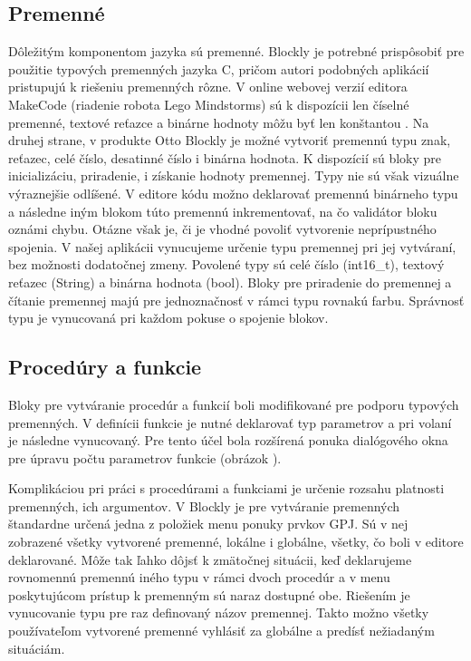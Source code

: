 \subsection{Premenné}
Dôležitým komponentom jazyka sú premenné. Blockly je potrebné prispôsobiť pre použitie typových premenných jazyka C, pričom autori podobných aplikácií pristupujú k riešeniu premenných rôzne. V online webovej verzií editora MakeCode (riadenie robota Lego Mindstorms) sú k dispozícii len číselné premenné, textové reťazce a binárne hodnoty môžu byť len konštantou \cite{makeCodeWebEditor}. Na druhej strane, v produkte Otto Blockly je možné vytvoriť premennú typu znak, reťazec, celé číslo, desatinné číslo i binárna hodnota. K dispozícií sú bloky pre inicializáciu, priradenie, i získanie hodnoty premennej. Typy nie sú však vizuálne výraznejšie odlíšené. V editore kódu možno deklarovať premennú binárneho typu a následne iným blokom túto premennú inkrementovať, na čo validátor bloku oznámi chybu. Otázne však je, či je vhodné povoliť vytvorenie neprípustného spojenia. V našej aplikácii vynucujeme určenie typu premennej pri jej vytváraní, bez možnosti dodatočnej zmeny. Povolené typy sú celé číslo (int16\_t), textový reťazec (String) a binárna hodnota (bool). Bloky pre priradenie do premennej a čítanie premennej majú pre jednoznačnosť v rámci typu rovnakú farbu. Správnosť typu je vynucovaná pri každom pokuse o spojenie blokov.

\subsection{Procedúry a funkcie}
Bloky pre vytváranie procedúr a funkcií boli modifikované pre podporu typových premenných. V definícii funkcie je nutné deklarovať typ parametrov a pri volaní je následne vynucovaný. Pre tento účel bola rozšírená ponuka dialógového okna pre úpravu počtu parametrov funkcie (obrázok \label{obr:pocedure-definition}).

Komplikáciou pri práci s procedúrami a funkciami je určenie rozsahu platnosti premenných, ich argumentov. V Blockly je pre vytváranie premenných štandardne určená jedna z položiek menu ponuky prvkov GPJ. Sú v nej zobrazené všetky vytvorené premenné, lokálne i globálne, všetky, čo boli v editore deklarované. Môže tak ľahko dôjsť k zmätočnej situácii, keď deklarujeme rovnomennú premennú iného typu v rámci dvoch procedúr a v menu poskytujúcom prístup k premenným sú naraz dostupné obe. Riešením je vynucovanie typu pre raz definovaný názov premennej. Takto možno všetky používateľom vytvorené premenné vyhlásiť za globálne a predísť nežiadaným situáciám.

